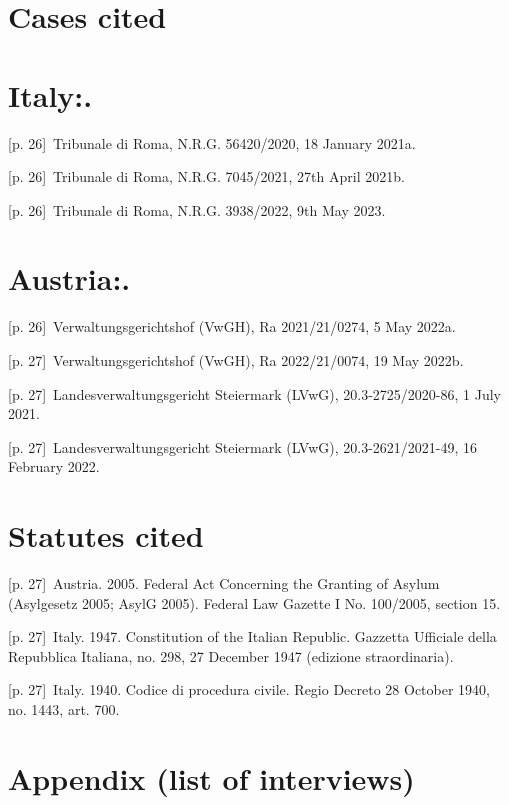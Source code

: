 \documentclass[10pt,a4paper]{article}
\begin{document}
\section*{Cases cited}
\section*{Italy:.}
{\scriptsize\color{gray} [p. 26]}\ Tribunale di Roma, N.R.G. 56420/2020, 18 January 2021a.\par
{\scriptsize\color{gray} [p. 26]}\ Tribunale di Roma, N.R.G. 7045/2021, 27th April 2021b.\par
{\scriptsize\color{gray} [p. 26]}\ Tribunale di Roma, N.R.G. 3938/2022, 9th May 2023.\par
{}\section*{Austria:.}
{\scriptsize\color{gray} [p. 26]}\ Verwaltungsgerichtshof (VwGH), Ra 2021/21/0274, 5 May 2022a.\par
{\scriptsize\color{gray} [p. 27]}\ Verwaltungsgerichtshof (VwGH), Ra 2022/21/0074, 19 May 2022b.\par
{\scriptsize\color{gray} [p. 27]}\ Landesverwaltungsgericht Steiermark (LVwG), 20.3-2725/2020-86, 1 July 2021.\par
{\scriptsize\color{gray} [p. 27]}\ Landesverwaltungsgericht Steiermark (LVwG), 20.3-2621/2021-49, 16 February 2022.\par
{}\section*{Statutes cited}
{\scriptsize\color{gray} [p. 27]}\ Austria. 2005. Federal Act Concerning the Granting of Asylum (Asylgesetz 2005; AsylG 2005). Federal Law Gazette I No. 100/2005, section 15.\par
{\scriptsize\color{gray} [p. 27]}\ Italy. 1947. Constitution of the Italian Republic. Gazzetta Ufficiale della Repubblica Italiana, no. 298, 27 December 1947 (edizione straordinaria).\par
{\scriptsize\color{gray} [p. 27]}\ Italy. 1940. Codice di procedura civile. Regio Decreto 28 October 1940, no. 1443, art. 700.\par
{}\section*{Appendix (list of interviews)}
\end{document}
